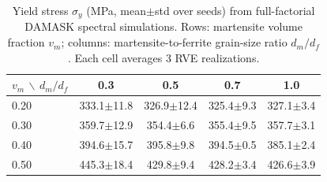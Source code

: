 \begin{table}[t]
  \centering
  \caption{Yield stress $\sigma_y$ (MPa, mean$\pm$std over seeds) from full-factorial DAMASK spectral simulations. Rows: martensite volume fraction $v_m$; columns: martensite-to-ferrite grain-size ratio $d_m/d_f$. Each cell averages 3 RVE realizations.}
  \label{tab:fac-sy}
  \begin{tabular}{l|cccc}
    \toprule
    $v_m$ $\backslash$ $d_m/d_f$ & 0.3 & 0.5 & 0.7 & 1.0 \\
    \midrule
    0.20 & 333.1$\pm$11.8 & 326.9$\pm$12.4 & 325.4$\pm$9.3 & 327.1$\pm$3.4 \\
    0.30 & 359.7$\pm$12.9 & 354.4$\pm$6.6 & 355.4$\pm$9.5 & 357.7$\pm$3.1 \\
    0.40 & 394.6$\pm$15.7 & 395.8$\pm$9.8 & 394.5$\pm$0.5 & 385.1$\pm$2.4 \\
    0.50 & 445.3$\pm$18.4 & 429.8$\pm$9.4 & 428.2$\pm$3.4 & 426.6$\pm$3.9 \\
    \bottomrule
  \end{tabular}
\end{table}